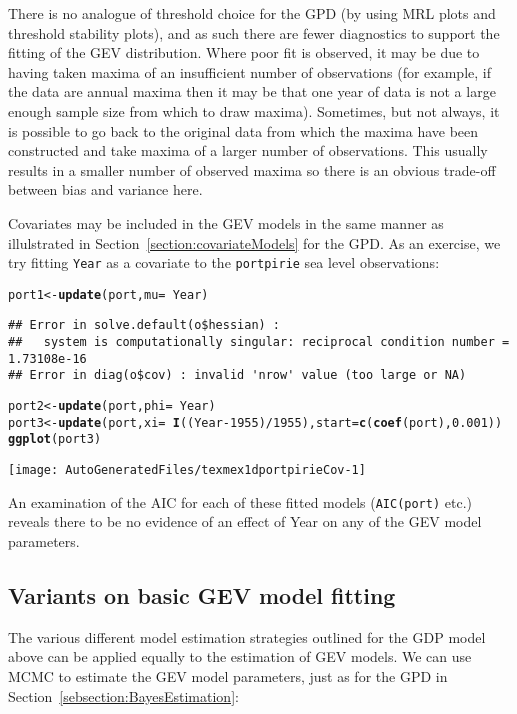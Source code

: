 \documentclass[10pt]{article}\usepackage[]{graphicx}\usepackage[]{color}
\makeatletter
\def\maxwidth{ %
  \ifdim\Gin@nat@width>\linewidth
    \linewidth
  \else
    \Gin@nat@width
  \fi
}
\newcommand{\hlnum}[1]{\textcolor[rgb]{0.686,0.059,0.569}{#1}}%
\newcommand{\hlopt}[1]{\textcolor[rgb]{0,0,0}{#1}}%
\newcommand{\hlstd}[1]{\textcolor[rgb]{0.345,0.345,0.345}{#1}}%
\newcommand{\hlkwb}[1]{\textcolor[rgb]{0.69,0.353,0.396}{#1}}%
\newcommand{\hlkwc}[1]{\textcolor[rgb]{0.333,0.667,0.333}{#1}}%
\newcommand{\hlkwd}[1]{\textcolor[rgb]{0.737,0.353,0.396}{\textbf{#1}}}%
\newenvironment{kframe}{%
 \def\at@end@of@kframe{}%
 \ifinner\ifhmode%
  \def\at@end@of@kframe{\end{minipage}}%
  \begin{minipage}{\columnwidth}%
 \fi\fi%
 \def\FrameCommand##1{\hskip\@totalleftmargin \hskip-\fboxsep
 \colorbox{shadecolor}{##1}\hskip-\fboxsep
     \hskip-\linewidth \hskip-\@totalleftmargin \hskip\columnwidth}%
 \MakeFramed {\advance\hsize-\width
   \@totalleftmargin\z@ \linewidth\hsize
   \@setminipage}}%
 {\par\unskip\endMakeFramed%
 \at@end@of@kframe}
\newenvironment{knitrout}{}{} %
\makeatother
\begin{document}
There is no analogue of threshold choice for the GPD (by using MRL plots and threshold stability plots), and as such there are fewer diagnostics to support the fitting of the GEV distribution.  Where poor fit is observed, it may be due to having taken maxima of an insufficient number of observations (for example, if the data are annual maxima then it may be that one year of data is not a large enough sample size from which to draw maxima).  Sometimes, but not always, it is possible to go back to the original data from which the maxima have been constructed and take maxima of a larger number of observations. This usually results in a smaller number of observed maxima so there is an obvious trade-off between bias and variance here.

Covariates may be included in the GEV models in the same manner as illulstrated in Section~\ref{section:covariateModels} for the GPD.  As an exercise, we try fitting {\tt Year} as a covariate to the {\tt portpirie} sea level observations:
\begin{knitrout}
\color{fgcolor}\begin{kframe}
\begin{alltt}
\hlstd{port1} \hlkwb{<-} \hlkwd{update}\hlstd{(port,}\hlkwc{mu}\hlstd{=}\hlopt{~}\hlstd{Year)}
\end{alltt}
\begin{verbatim}
## Error in solve.default(o$hessian) : 
##   system is computationally singular: reciprocal condition number = 1.73108e-16
## Error in diag(o$cov) : invalid 'nrow' value (too large or NA)
\end{verbatim}
\begin{alltt}
\hlstd{port2} \hlkwb{<-} \hlkwd{update}\hlstd{(port,}\hlkwc{phi}\hlstd{=}\hlopt{~}\hlstd{Year)}
\hlstd{port3} \hlkwb{<-} \hlkwd{update}\hlstd{(port,}\hlkwc{xi}\hlstd{=}\hlopt{~}\hlkwd{I}\hlstd{((Year}\hlopt{-}\hlnum{1955}\hlstd{)}\hlopt{/}\hlnum{1955}\hlstd{),}\hlkwc{start}\hlstd{=}\hlkwd{c}\hlstd{(}\hlkwd{coef}\hlstd{(port),}\hlnum{0.001}\hlstd{))}
\hlkwd{ggplot}\hlstd{(port3)}
\end{alltt}
\end{kframe}
\texttt{[image: AutoGeneratedFiles/texmex1dportpirieCov-1]} 

\end{knitrout}
An examination of the AIC for each of these fitted models ({\tt AIC(port)} etc.) reveals there to be no evidence of an effect of Year on any of the GEV model parameters.
%
\subsection{Variants on basic GEV model fitting}
%
The various different model estimation strategies outlined for the GDP model above can be applied equally to the estimation of GEV models.  We can use MCMC to estimate the GEV model parameters, just as for the GPD in Section~\ref{sebsection:BayesEstimation}:
\end{document}
